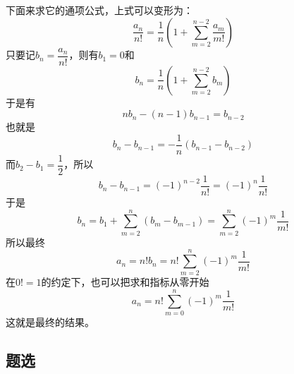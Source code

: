 \begin{example}[伯努利信封问题]
下面来求它的通项公式，上式可以变形为：
\begin{equation}
  \label{recursive-equation-derangement-2}
  \frac{a_n}{n!}=\frac{1}{n}(1+\sum_{m=2}^{n-2}\frac{a_m}{m!})
\end{equation}
只要记$b_n=\dfrac{a_n}{n!}$，则有$b_1=0$和
\begin{equation}
  \label{eq:recursive-equation-derangement-simple}
  b_n=\frac{1}{n}(1+\sum_{m=2}^{n-2}b_m)
\end{equation}
于是有
\begin{equation}
  \label{eq:recursive-equation-derangement-simple-diff}
  nb_n-(n-1)b_{n-1}=b_{n-2}
\end{equation}
也就是
\begin{equation}
  \label{eq:recursive-equation-derangement-simple-diff2}
  b_n-b_{n-1}=-\frac{1}{n}(b_{n-1}-b_{n-2})
\end{equation}
而$b_2-b_1=\dfrac{1}{2}$，所以
\begin{equation}
  \label{eq:recursive-equation-derangement-bn}
  b_n-b_{n-1}=(-1)^{n-2}\frac{1}{n!}=(-1)^n\frac{1}{n!}
\end{equation}
于是
\begin{equation}
  \label{eq:derangement-bn}
  b_n=b_1+\sum_{m=2}^{n}(b_m-b_{m-1})=\sum_{m=2}^n(-1)^m\frac{1}{m!}
\end{equation}
所以最终
\begin{equation}
  \label{eq:derangement-an}
  a_n=n!b_n=n!\sum_{m=2}^n(-1)^m\frac{1}{m!}
\end{equation}
在$0!=1$的约定下，也可以把求和指标从零开始
\begin{equation}
  \label{eq:derangement-an2}
  a_n=n!\sum_{m=0}^n(-1)^m\frac{1}{m!}
\end{equation}
这就是最终的结果。

\end{example}

\subsection{题选}
\label{sec:exercise-for-number-series}




